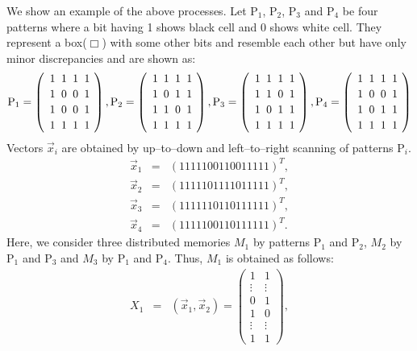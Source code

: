 We show an example of the above processes.  Let 
P$_1$, P$_2$, P$_3$ and P$_4$ be four patterns 
where a bit having 1 shows black cell and 0 shows 
white cell.  They represent a box($\Box $) with some other 
bits and resemble each other but have only minor 
discrepancies and are shown as:  
{\footnotesize
\[ \mbox{P}_1 = \left(\begin{array}{p{0.05em}p{0.05em}p{0.05em}p{0.05em}}
1&1&1&1 \\[-1em] 1&0&0&1 \\[-1em]
1&0&0&1 \\[-1em] 1&1&1&1 
\end{array} \ \right ), 
\mbox{P}_2 = \left(\begin{array}{p{0.01em}p{0.05em}p{0.05em}p{0.05em}}
1&1&1&1 \\[-1em] 1&0&1&1 \\[-1em]
1&1&0&1 \\[-1em] 1&1&1&1 
\end{array} \ \right ), 
\mbox{P}_3 = \left(\begin{array}{p{0.05em}p{0.05em}p{0.05em}p{0.05em}}
1&1&1&1 \\[-1em] 1&1&0&1 \\[-1em]
1&0&1&1 \\[-1em] 1&1&1&1 
\end{array} \ \right ), 
\mbox{P}_4 = \left(\begin{array}{p{0.05em}p{0.05em}p{0.05em}p{0.05em}}
1&1&1&1 \\[-1em] 1&0&0&1 \\[-1em]
1&0&1&1 \\[-1em] 1&1&1&1 
\end{array} \ \right ) \]
}
Vectors $\vec{x}_i $ are obtained by up--to--down 
and left--to--right scanning of patterns P$_i$.  
\begin{eqnarray*}
\vec{x}_1 &=& ( 1 1 1 1 1 0 0 1 1 0 0 1 1 1 1 1 )^T , \\
\vec{x}_2 &=& ( 1 1 1 1 1 0 1 1 1 1 0 1 1 1 1 1 )^T , \\
\vec{x}_3 &=& ( 1 1 1 1 1 1 0 1 1 0 1 1 1 1 1 1 )^T , \\
\vec{x}_4 &=& ( 1 1 1 1 1 0 0 1 1 0 1 1 1 1 1 1 )^T .
\end{eqnarray*}
Here, we consider three distributed memories 
$M_1 $ by patterns P$_1$ and P$_2$, $M_2 $ by 
P$_1$ and P$_3$ and $M_3 $ by P$_1$ and P$_4$.  
Thus, $M_1 $ is obtained as follows: 
\begin{eqnarray*}
X_1 &=& (\vec{x}_1, \vec{x}_2) = 
\left( \begin{array}{cc} 
1 & 1 \\ \vdots & \vdots \\ 0 & 1 \\ 1 & 0 \\ \vdots & \vdots \\ 1 & 1 
\end{array} \right) , 
\end{eqnarray*}
